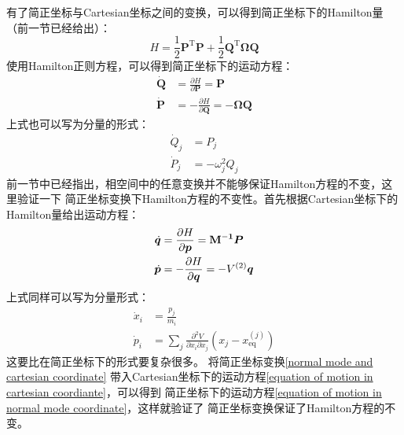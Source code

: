     \splitline

    有了简正坐标与Cartesian坐标之间的变换，可以得到简正坐标下的Hamilton量（前一节已经给出）：
    \begin{equation}
        H = \frac 12 \bm{P}^\mathrm{T}\bm{P} + \frac 12 \bm{Q}^\mathrm{T} \bm{\Omega Q}
    \end{equation}
    使用Hamilton正则方程，可以得到简正坐标下的运动方程：
    \begin{equation}
        \begin{aligned}
            \bm{\dot{Q}} &= \frac {\partial H}{\partial \bm{P}} = \bm{P}\\
            \bm{\dot{P}} &= -\frac {\partial H}{\partial \bm{Q}} = -\bm{\Omega Q}
        \end{aligned}
        \label{equation of motion in normal mode coordinate}
    \end{equation}
    上式也可以写为分量的形式：
    \begin{equation}
        \begin{aligned}
            \dot{Q}_j &= P_j\\
            \dot{P}_j &= - \omega_j^2 Q_j
        \end{aligned}
    \end{equation}
    前一节中已经指出，相空间中的任意变换并不能够保证Hamilton方程的不变，这里验证一下
    简正坐标变换下Hamilton方程的不变性。首先根据Cartesian坐标下的Hamilton量给出运动方程：
    \begin{equation}
        \begin{split}
            \dot{\bm{q}} &= \frac{\partial{H}}{\partial{\bm{p}}} = \mathbf{M^{-1}}\bm{P}\\
            \dot{\bm{p}} &= -\frac{\partial{H}}{\partial{\bm{q}}} = -V^{(2)}\bm{q}
        \end{split}
        \label{equation of motion in cartesian coordiante}
    \end{equation}
    上式同样可以写为分量形式：
    \begin{equation}
        \begin{aligned}
            \dot{x}_i &= \frac {p_j}{m_i}\\
            \dot{p}_i &= \sum_j \frac {\partial^2 V}{\partial x_i \partial x_j} (x_j - x_\mathrm{eq}^{(j)})
        \end{aligned}
    \end{equation}
    这要比在简正坐标下的形式要复杂很多。
    将简正坐标变换\ref{normal mode and cartesian coordinate}
    带入Cartesian坐标下的运动方程\ref{equation of motion in cartesian coordiante}，可以得到
    简正坐标下的运动方程\ref{equation of motion in normal mode coordinate}，这样就验证了
    简正坐标变换保证了Hamilton方程的不变。

